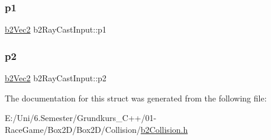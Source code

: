 \mbox{\label{structb2_ray_cast_input_a7254a7062422833b1124fa464ab4caf3}} 
\subsubsection{\texorpdfstring{p1}{p1}}
{\footnotesize\ttfamily \mbox{\hyperlink{structb2_vec2}{b2\+Vec2}} b2\+Ray\+Cast\+Input\+::p1}

\mbox{\label{structb2_ray_cast_input_a850102c843469781a3a627c871043d0b}} 
\subsubsection{\texorpdfstring{p2}{p2}}
{\footnotesize\ttfamily \mbox{\hyperlink{structb2_vec2}{b2\+Vec2}} b2\+Ray\+Cast\+Input\+::p2}



The documentation for this struct was generated from the following file\+:\begin{DoxyCompactItemize}
\item 
E\+:/\+Uni/6.\+Semester/\+Grundkurs\+\_\+\+C++/01-\/\+Race\+Game/\+Box2\+D/\+Box2\+D/\+Collision/\mbox{\hyperlink{b2_collision_8h}{b2\+Collision.\+h}}\end{DoxyCompactItemize}
